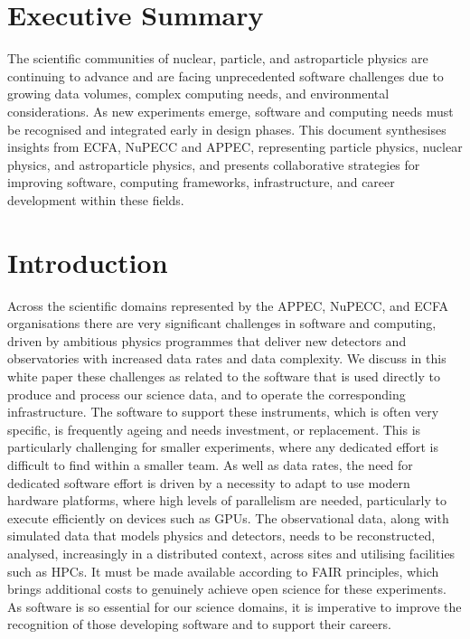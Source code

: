 \section{Executive Summary}

The scientific communities of nuclear, particle, and astroparticle physics are continuing to advance and are facing unprecedented software challenges due to growing data volumes, complex computing needs, and environmental considerations. As new experiments emerge, software and computing needs must be recognised and integrated early in design phases. This document synthesises insights from ECFA, NuPECC and APPEC, representing particle physics, nuclear physics, and astroparticle physics, and presents collaborative strategies for improving software, computing frameworks, infrastructure, and career development within these fields.


\section{Introduction}

Across the scientific domains represented by the APPEC, NuPECC, and ECFA organisations there are very significant challenges in software and computing, driven by ambitious physics programmes that deliver new detectors and observatories with increased data rates and data complexity. We discuss in this white paper these challenges as related to the software that is used directly to produce and process our science data, and to operate the corresponding infrastructure. The software to support these instruments, which is often very specific, is frequently ageing and needs investment, or replacement. This is particularly challenging for smaller experiments, where any dedicated effort is difficult to find within a smaller team. As well as data rates, the need for dedicated software effort is driven by a necessity to adapt to use modern hardware platforms, where high levels of parallelism are needed, particularly to execute efficiently on devices such as GPUs. The observational data, along with simulated data that models physics and detectors, needs to be reconstructed, analysed, increasingly in a distributed context, across sites and utilising facilities such as HPCs. It must be made available according to FAIR principles, which brings additional costs to genuinely achieve open science for these experiments. As software is so essential for our science domains, it is imperative to improve the recognition of those developing software and to support their careers.

